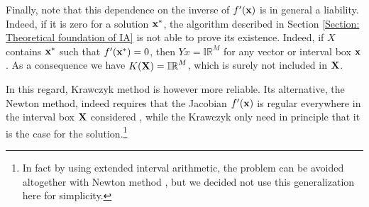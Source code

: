 \documentclass[
11pt, %
english, %
singlespacing, %
nolistspacing, %
liststotoc, %
headsepline, %
]{MastersDoctoralThesis} %
\begin{document}
Finally, note that this dependence on the inverse of $f'(\boldsymbol{\mathrm{x}})$ is in general a liability. Indeed, if it is zero for a solution $\boldsymbol{\mathrm{x}}^*$, the algorithm described in Section \ref{Section: Theoretical foundation of IA} is not able to prove its existence. Indeed, if $X$ contains $\boldsymbol{\mathrm{x}}^*$ such that $f'(\boldsymbol{\mathrm{x}}^*) = 0$, then $Y x = \mathbb{IR}^M$ for any vector or interval box $\boldsymbol{\mathrm{x}}$. As a consequence we have $K(\boldsymbol{\mathrm{X}}) = \mathbb{IR}^M$, which is surely not included in $\boldsymbol{\mathrm{X}}$.

In this regard, Krawczyk method is however more reliable. Its alternative, the Newton method, indeed requires that the Jacobian $f'(\boldsymbol{\mathrm{x}})$ is regular everywhere in the interval box $\boldsymbol{\mathrm{X}}$ considered \cite{moore2009introduction, tucker2011validated}, while the Krawczyk only need in principle that it is the case for the solution.\footnote{In fact by using extended interval arithmetic, the problem can be avoided altogether with Newton method \cite{hansen1978globally}, but we decided not use this generalization here for simplicity.}



\printbibliography[heading=bibintoc]{}

\end{document}
